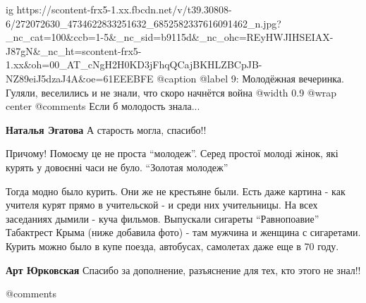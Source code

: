  
 
 
 
 

\ifcmt
  ig https://scontent-frx5-1.xx.fbcdn.net/v/t39.30808-6/272072630_4734622833251632_6852582337616091462_n.jpg?_nc_cat=100&ccb=1-5&_nc_sid=b9115d&_nc_ohc=REyHWJIHSEIAX-J87gN&_nc_ht=scontent-frx5-1.xx&oh=00_AT_cNgH2H0KD3jFhqQCajBKHLZBCpJB-NZ89eiJ5dzaJ4A&oe=61EEEBFE
  @caption @label 9: Молодёжная вечеринка. Гуляли, веселились и не знали, что скоро начнётся война
	@width 0.9
	@wrap center
	@comments%
Если б молодость знала...

\textbf{Наталья Эгатова} А старость могла, спасибо!!


Причому! Помоєму це не проста \enquote{молодеж}. Серед простої молоді жінок,
які курять у довоєнні часи не було. \enquote{Золотая молодеж}


Тогда модно было курить. Они же не крестьяне были. Есть даже картина - как
учителя курят прямо в учительской - и среди них учительницы. На всех заседаниях
дымили - куча фильмов. Выпускали сигареты \enquote{Равнопоавие} Табактрест Крыма (ниже
добавила фото) - там мужчина и женщина с сигаретами. Курить можно было в купе
поезда, автобусах, самолетах даже еще в 70 году.

\textbf{Арт Юрковская} Спасибо за дополнение, разъяснение для тех, кто этого не знал!!

	@comments%
\fi
